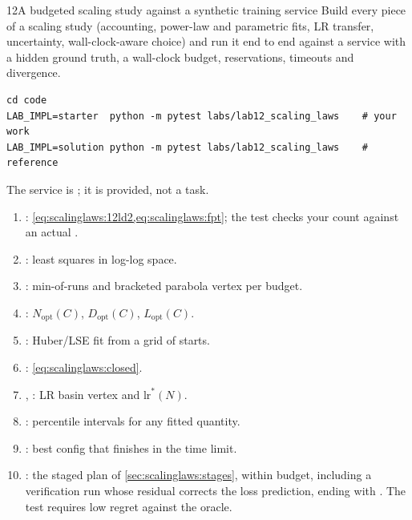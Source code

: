\begin{labbox}{12}{A budgeted scaling study against a synthetic training service}
Build every piece of a scaling study (accounting, power-law and parametric fits, LR transfer,
uncertainty, wall-clock-aware choice) and run it end to end against a service with a hidden
ground truth, a wall-clock budget, reservations, timeouts and divergence.

\begin{lstlisting}[style=shell]
cd code
LAB_IMPL=starter  python -m pytest labs/lab12_scaling_laws    # your work
LAB_IMPL=solution python -m pytest labs/lab12_scaling_laws    # reference
\end{lstlisting}
The service is ; it is provided, not a task.

\begin{enumerate}
\item {}: \cref{eq:scalinglaws:12ld2,eq:scalinglaws:fpt}; the
      test checks your count against an actual .
\item {}: least squares in log-log space.
\item {}: min-of-runs and bracketed parabola vertex per budget.
\item {}: $N_{\text{opt}}(C)$, $D_{\text{opt}}(C)$, $L_{\text{opt}}(C)$.
\item {}: Huber/LSE fit from a grid of starts.
\item {}: \cref{eq:scalinglaws:closed}.
\item {}, : LR basin vertex and $\text{lr}^*(N)$.
\item {}: percentile intervals for any fitted quantity.
\item {}: best config that finishes in the time limit.
\item {}: the staged plan of \cref{sec:scalinglaws:stages}, within budget,
      including a verification run whose residual corrects the loss prediction, ending with
      . The test requires low regret against the oracle.
\end{enumerate}


\end{labbox}
